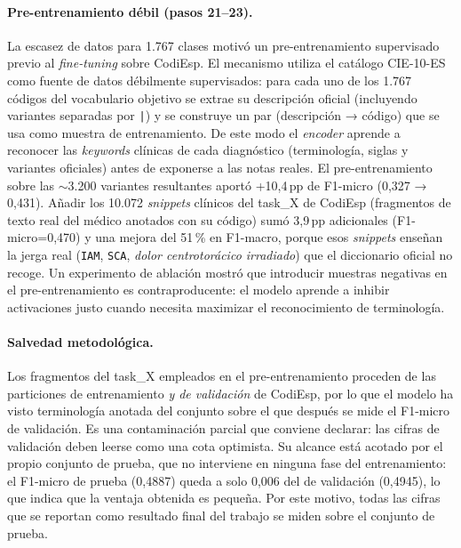 \paragraph{Pre-entrenamiento débil (pasos 21--23).}
La escasez de datos para 1.767 clases motivó un pre-entrenamiento supervisado previo al \emph{fine-tuning} sobre CodiEsp. El mecanismo utiliza el catálogo CIE-10-ES como fuente de datos débilmente supervisados: para cada uno de los 1.767 códigos del vocabulario objetivo se extrae su descripción oficial (incluyendo variantes separadas por \texttt{|}) y se construye un par (descripción → código) que se usa como muestra de entrenamiento. De este modo el \emph{encoder} aprende a reconocer las \emph{keywords} clínicas de cada diagnóstico (terminología, siglas y variantes oficiales) antes de exponerse a las notas reales. El pre-entrenamiento sobre las $\sim$3.200 variantes resultantes aportó +10,4\,pp de F1-micro (0,327 → 0,431). Añadir los 10.072 \emph{snippets} clínicos del task\_X de CodiEsp (fragmentos de texto real del médico anotados con su código) sumó 3,9\,pp adicionales (F1-micro=0,470) y una mejora del 51\,\% en F1-macro, porque esos \emph{snippets} enseñan la jerga real (\texttt{IAM}, \texttt{SCA}, \emph{dolor centrotorácico irradiado}) que el diccionario oficial no recoge. Un experimento de ablación mostró que introducir muestras negativas en el pre-entrenamiento es contraproducente: el modelo aprende a inhibir activaciones justo cuando necesita maximizar el reconocimiento de terminología.

\paragraph{Salvedad metodológica.} Los fragmentos del task\_X empleados en el pre-entrenamiento proceden de las particiones de entrenamiento \emph{y de validación} de CodiEsp, por lo que el modelo ha visto terminología anotada del conjunto sobre el que después se mide el F1-micro de validación. Es una contaminación parcial que conviene declarar: las cifras de validación deben leerse como una cota optimista. Su alcance está acotado por el propio conjunto de prueba, que no interviene en ninguna fase del entrenamiento: el F1-micro de prueba (0,4887) queda a solo 0,006 del de validación (0,4945), lo que indica que la ventaja obtenida es pequeña. Por este motivo, todas las cifras que se reportan como resultado final del trabajo se miden sobre el conjunto de prueba.

